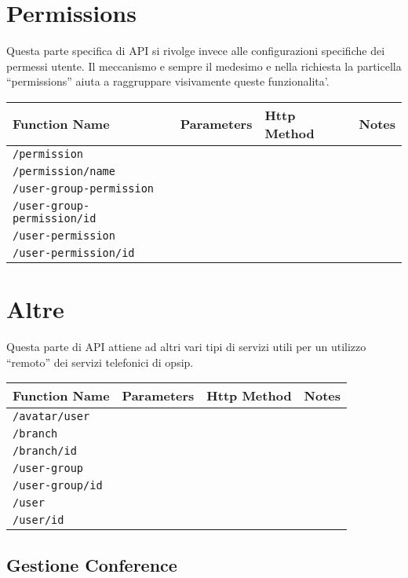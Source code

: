 \section{Permissions}

Questa parte specifica di API si rivolge invece alle configurazioni specifiche dei permessi utente.
Il meccanismo e sempre il medesimo e nella richiesta la particella ``permissions'' aiuta a raggruppare visivamente queste funzionalita'.
\bigskip

\begin{tabular}[c]{l | c || l || p{5cm}}
Function Name & Parameters & Http Method & Notes \\
\hline \hline
\texttt{/permission} & & & \\ \hline
\texttt{/permission/{name}} & & & \\ \hline
\texttt{/user-group-permission} & & & \\ \hline
\texttt{/user-group-permission/{id}} & & & \\ \hline
\texttt{/user-permission} & & & \\ \hline
\texttt{/user-permission/{id}} & & & \\ \hline
\end{tabular}

\section{Altre}

Questa parte di API attiene ad altri vari tipi di servizi utili per un utilizzo ``remoto'' dei servizi telefonici di opsip.
\bigskip

\begin{tabular}[c]{l | c || l || p{5cm}}
Function Name & Parameters & Http Method & Notes \\
\hline \hline
\texttt{/avatar/{user}} & & & \\ \hline
\texttt{/branch} & & & \\ \hline
\texttt{/branch/{id}} & & & \\ \hline
\texttt{/user-group} & & & \\ \hline
\texttt{/user-group/{id}} & & & \\ \hline
\texttt{/user} & & & \\ \hline
\texttt{/user/{id}} & & & \\ \hline
\end{tabular}


\subsection{Gestione Conference}

